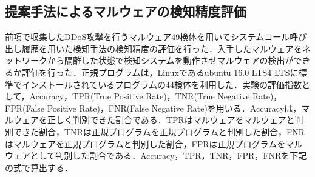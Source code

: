 \newpage 
\subsection{提案手法によるマルウェアの検知精度評価}
前項で収集したDDoS攻撃を行うマルウェア49検体を用いてシステムコール呼び出し履歴を用いた検知手法の検知精度の評価を行った．入手したマルウェアをネットワークから隔離した状態で検知システムを動作させマルウェアの検出ができるか評価を行った．正規プログラムは，Linuxであるubuntu  16.0 LTS4 LTSに標準でインストールされているプログラムの44検体を利用した．実験の評価指数として，Accuracy，TPR(True Positive Rate)，TNR(True Negative Rate)，FPR(False Positive Rate)，FNR(False Negative Rate)を用いる．Accuracyは，マルウェアを正しく判別できた割合である．TPRはマルウェアをマルウェアと判別できた割合，TNRは正規プログラムを正規プログラムと判別した割合，FNRはマルウェアを正規プログラムと判別した割合，FPRは正規プログラムをマルウェアとして判別した割合である．Accuracy，TPR，TNR，FPR，FNRを下記の式で算出する．


